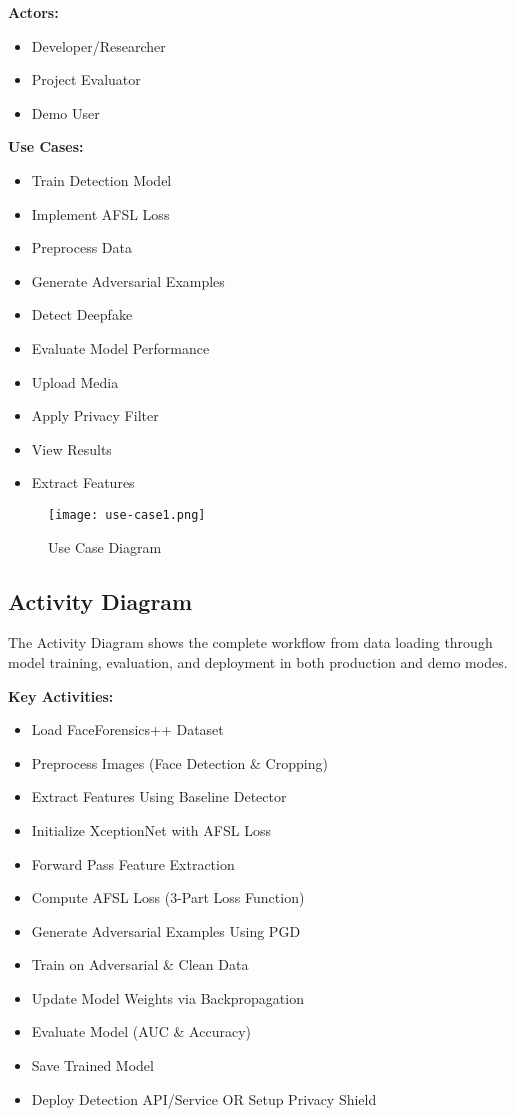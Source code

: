 \documentclass[a4paper,12pt]{article}
\begin{document}
\textbf{Actors:}
\begin{itemize}
    \item Developer/Researcher
    \item Project Evaluator  
    \item Demo User
\end{itemize}

\textbf{Use Cases:}
\begin{itemize}
    \item Train Detection Model
    \item Implement AFSL Loss
    \item Preprocess Data
    \item Generate Adversarial Examples
    \item Detect Deepfake
    \item Evaluate Model Performance
    \item Upload Media
    \item Apply Privacy Filter
    \item View Results
    \item Extract Features
\end{itemize}

\begin{figure}[h]
    \centering
     \texttt{[image: use-case1.png]}
    \caption{Use Case Diagram}
    \label{fig:usecase}
\end{figure}

\clearpage

\subsection{Activity Diagram}
The Activity Diagram shows the complete workflow from data loading through model training, evaluation, and deployment in both production and demo modes.

\textbf{Key Activities:}
\begin{itemize}
    \item Load FaceForensics++ Dataset
    \item Preprocess Images (Face Detection \& Cropping)
    \item Extract Features Using Baseline Detector
    \item Initialize XceptionNet with AFSL Loss
    \item Forward Pass Feature Extraction
    \item Compute AFSL Loss (3-Part Loss Function)
    \item Generate Adversarial Examples Using PGD
    \item Train on Adversarial \& Clean Data
    \item Update Model Weights via Backpropagation
    \item Evaluate Model (AUC \& Accuracy)
    \item Save Trained Model
    \item Deploy Detection API/Service OR Setup Privacy Shield
\end{itemize}
\end{document}
